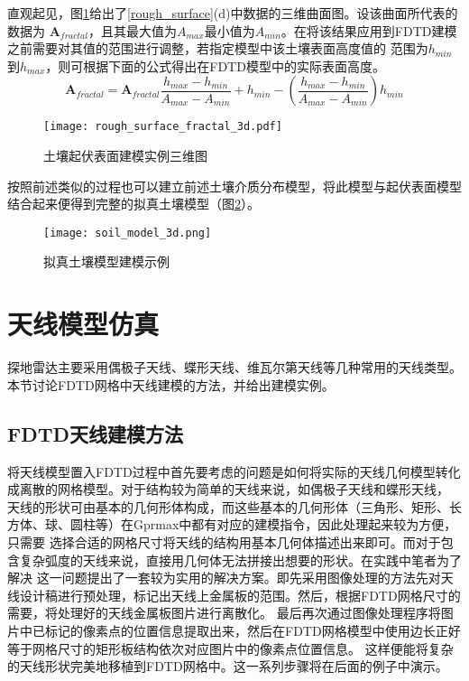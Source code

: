 直观起见，图\ref{rough_surface_3d}给出了\ref{rough_surface}(d)中数据的三维曲面图。设该曲面所代表的数据为
$\mathbf{A}_{fractal}$，且其最大值为$A_{max}$最小值为$A_{min}$。在将该结果应用到FDTD建模之前需要对其值的范围进行调整，若指定模型中该土壤表面高度值的
范围为$h_{min}$到$h_{max}$，则可根据下面的公式得出在FDTD模型中的实际表面高度。
\begin{equation}
	\mathbf{A}_{fractal} = \mathbf{A}_{fractal} \frac{h_{max} - h_{min}}{A_{max} - A_{min}} + 
		h_{min} - (\frac{h_{max} - h_{min}}{A_{max} - A_{min}}) h_{min}
\end{equation}
\begin{figure}[htbp]
	\texttt{[image: rough\_surface\_fractal\_3d.pdf]}
	\caption[]{土壤起伏表面建模实例三维图}
	\label{rough_surface_3d}
\end{figure}

按照前述类似的过程也可以建立前述土壤介质分布模型，将此模型与起伏表面模型结合起来便得到完整的拟真土壤模型（图\ref{soil_model_3d}）。


\begin{figure}[htbp]
	\texttt{[image: soil\_model\_3d.png]}
	\caption{拟真土壤模型建模示例}
	\label{soil_model_3d}
\end{figure}
\section{天线模型仿真}
探地雷达主要采用偶极子天线、蝶形天线、维瓦尔第天线等几种常用的天线类型。本节讨论FDTD网格中天线建模的方法，并给出建模实例。
\subsection{FDTD天线建模方法}
将天线模型置入FDTD过程中首先要考虑的问题是如何将实际的天线几何模型转化成离散的网格模型。对于结构较为简单的天线来说，如偶极子天线和蝶形天线，
天线的形状可由基本的几何形体构成，而这些基本的几何形体（三角形、矩形、长方体、球、圆柱等）在Gprmax中都有对应的建模指令，因此处理起来较为方便，只需要
选择合适的网格尺寸将天线的结构用基本几何体描述出来即可。而对于包含复杂弧度的天线来说，直接用几何体无法拼接出想要的形状。在实践中笔者为了解决
这一问题提出了一套较为实用的解决方案。即先采用图像处理的方法先对天线设计稿进行预处理，标记出天线上金属板的范围。然后，根据FDTD网格尺寸的需要，将处理好的天线金属板图片进行离散化。
最后再次通过图像处理程序将图片中已标记的像素点的位置信息提取出来，然后在FDTD网格模型中使用边长正好等于网格尺寸的矩形板结构依次对应图片中的像素点位置信息。
这样便能将复杂的天线形状完美地移植到FDTD网格中。这一系列步骤将在后面的例子中演示。

